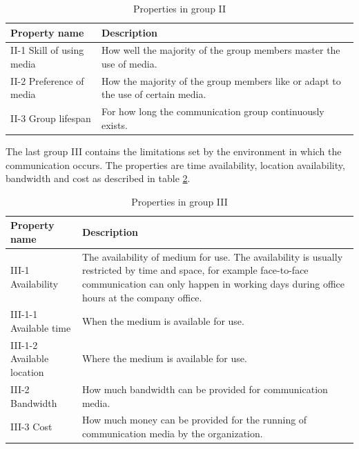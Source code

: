 \documentclass[english,12pt,a4paper,pdftex]{article}
\begin{document}
\begin{table}[!h]
\renewcommand{\arraystretch}{1.3}
\caption{Properties in group II}
\label{table:mft_group2}
\centering
\begin{tabular}{|p{4cm}|p{10cm}|}
\hline
\textbf{Property name} & \textbf{Description}\\
\hline
II-1 Skill of using media & How well the majority of the group members master the use of media.  \\
\hline
II-2 Preference of media & How the majority of the group members like or adapt to the use of certain media. \\
\hline
II-3 Group lifespan & For how long the communication group continuously exists. \\
\hline
\end{tabular}
\end{table}

The last group III contains the limitations set by the environment in which the communication occurs. The properties are time availability, location availability, bandwidth and cost as described in table \ref{table:mft_group3}.

\begin{table}[!h]
\renewcommand{\arraystretch}{1.3}
\caption{Properties in group III}
\label{table:mft_group3}
\centering
\begin{tabular}{|p{4cm}|p{10cm}|}
\hline
\textbf{Property name} & \textbf{Description}\\
\hline
III-1 Availability & The availability of medium for use. The availability is usually restricted by time and space, for example face-to-face communication can only happen in working days during office hours at the company office. \\
\hline
III-1-1 Available time & When the medium is available for use. \\
\hline
III-1-2 Available location & Where the medium is available for use. \\
\hline
III-2 Bandwidth & How much bandwidth can be provided for communication media. \\
\hline
III-3 Cost & How much money can be provided for the running of communication media by the organization. \\
\hline
\end{tabular}
\end{table}
\end{document}
